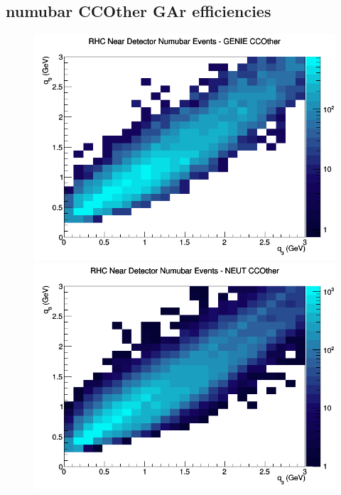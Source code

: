 \documentclass[12pt]{article}
\begin{document}
\subsection{numubar CCOther GAr efficiencies}
\begin{figure}[h]
\includegraphics[width=\linewidth]{eff_q0_q3/GAr/CCOther_RHC_ND_numubar_q3_q0_GENIE.png}
\endminipage
{}
\includegraphics[width=\linewidth]{eff_q0_q3/GAr/CCOther_RHC_ND_numubar_q3_q0_NEUT.png}
\endminipage
{}

\end{figure}
\end{document}
